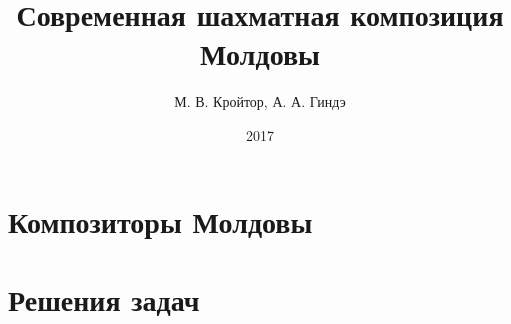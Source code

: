 \documentclass[12pt,a5paper]{book}
\title{Современная шахматная композиция Молдовы}
\author{М. В. Кройтор, А. А. Гиндэ}
\date{2017}
\begin{document}
\maketitle
\tableofcontents

\chapter{Композиторы Молдовы}






\chapter{Решения задач}
%
%
%
\end{document}
